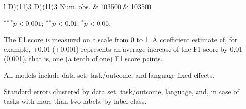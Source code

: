\begin{table}
\begin{center}
\begin{threeparttable}
\begin{tabular}{l D{)}{)}{11)3} D{)}{)}{11)3}}
Num. obs.                                           & 103500                  & 103500                  \\
\bottomrule
\end{tabular}
\begin{tablenotes}[flushleft]
\scriptsize{\item $^{***}p<0.001$; $^{**}p<0.01$; $^{*}p<0.05$. \item The F1 score is measured on a scale from 0 to 1. A coefficient estimate of, for example, +0.01 (+0.001) represents an average increase of the F1 score by 0.01 (0.001), that is, one (a tenth of one) F1 score points. \item All models include data set, task/outcome, and language fixed effects. \item Standard errors clustered by data set, task/outcome, language, and, in case of tasks with more than two labels, by label class. }
\end{tablenotes}
\end{threeparttable}
\label{tab:translation_model_effects}
\end{center}
\end{table}
